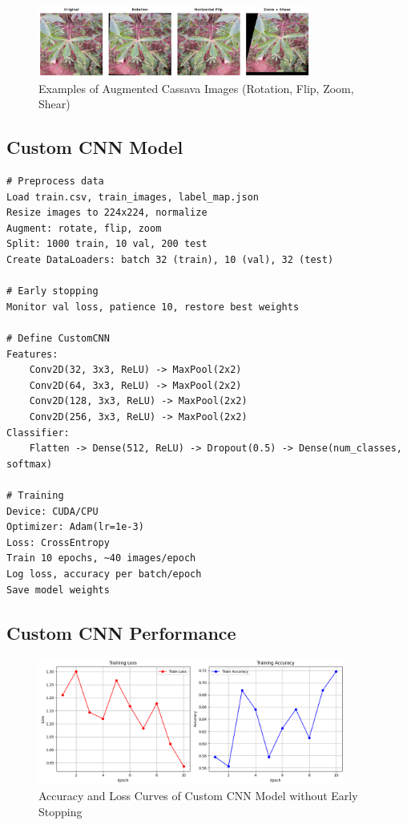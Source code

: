 \documentclass[a4paper,12pt]{article}
\begin{document}
\begin{figure}[H]
    \centering
    \includegraphics[width=0.8\textwidth]{assets/cassava/data_aug.png}
    \caption{Examples of Augmented Cassava Images (Rotation, Flip, Zoom, Shear)}
\end{figure}

\subsection*{Custom CNN Model}
\begin{lstlisting}
# Preprocess data
Load train.csv, train_images, label_map.json
Resize images to 224x224, normalize
Augment: rotate, flip, zoom
Split: 1000 train, 10 val, 200 test
Create DataLoaders: batch 32 (train), 10 (val), 32 (test)

# Early stopping
Monitor val loss, patience 10, restore best weights

# Define CustomCNN
Features:
    Conv2D(32, 3x3, ReLU) -> MaxPool(2x2)
    Conv2D(64, 3x3, ReLU) -> MaxPool(2x2)
    Conv2D(128, 3x3, ReLU) -> MaxPool(2x2)
    Conv2D(256, 3x3, ReLU) -> MaxPool(2x2)
Classifier:
    Flatten -> Dense(512, ReLU) -> Dropout(0.5) -> Dense(num_classes, softmax)

# Training
Device: CUDA/CPU
Optimizer: Adam(lr=1e-3)
Loss: CrossEntropy
Train 10 epochs, ~40 images/epoch
Log loss, accuracy per batch/epoch
Save model weights
\end{lstlisting}
\subsection*{Custom CNN Performance}
\begin{figure}[H]
    \centering
    \includegraphics[width=0.9\textwidth]{assets/cassava/custom_acc_loss.png}
    \caption{Accuracy and Loss Curves of Custom CNN Model without Early Stopping}
\end{figure}
\end{document}
